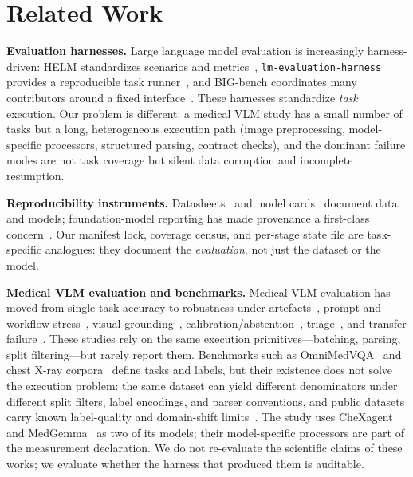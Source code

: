 \section{Related Work}
\label{sec:related}

\textbf{Evaluation harnesses.} Large language model evaluation is increasingly harness-driven: HELM standardizes scenarios and metrics~\citep{liang2022helm}, \texttt{lm-evaluation-harness} provides a reproducible task runner~\citep{gao2023lm}, and BIG-bench coordinates many contributors around a fixed interface~\citep{srivastava2022bigbench}. These harnesses standardize \emph{task} execution. Our problem is different: a medical VLM study has a small number of tasks but a long, heterogeneous execution path (image preprocessing, model-specific processors, structured parsing, contract checks), and the dominant failure modes are not task coverage but silent data corruption and incomplete resumption.

\textbf{Reproducibility instruments.} Datasheets~\citep{gebru2021datasheets} and model cards~\citep{mitchell2019model} document data and models; foundation-model reporting has made provenance a first-class concern~\citep{bommasani2021foundation}. Our manifest lock, coverage census, and per-stage state file are task-specific analogues: they document the \emph{evaluation}, not just the dataset or the model.

\textbf{Medical VLM evaluation and benchmarks.} Medical VLM evaluation has moved from single-task accuracy to robustness under artefacts~\citep{cheng2025robustness}, prompt and workflow stress~\citep{yang2026stress}, visual grounding~\citep{zafar2026beyond}, calibration/abstention~\citep{qu2026accuracy}, triage~\citep{li2025atcxr}, and transfer failure~\citep{fisher2025negative}. These studies rely on the same execution primitives---batching, parsing, split filtering---but rarely report them. Benchmarks such as OmniMedVQA~\citep{hu2023omnimedvqa} and chest X-ray corpora~\citep{wang2017chestxray8,bustos2020padchest,irvin2019chexpert,johnson2019mimic} define tasks and labels, but their existence does not solve the execution problem: the same dataset can yield different denominators under different split filters, label encodings, and parser conventions, and public datasets carry known label-quality and domain-shift limits~\citep{rafferty2026limitations}. The study uses CheXagent~\citep{chen2024chexagent} and MedGemma~\citep{sellergren2025medgemma} as two of its models; their model-specific processors are part of the measurement declaration. We do not re-evaluate the scientific claims of these works; we evaluate whether the harness that produced them is auditable.

